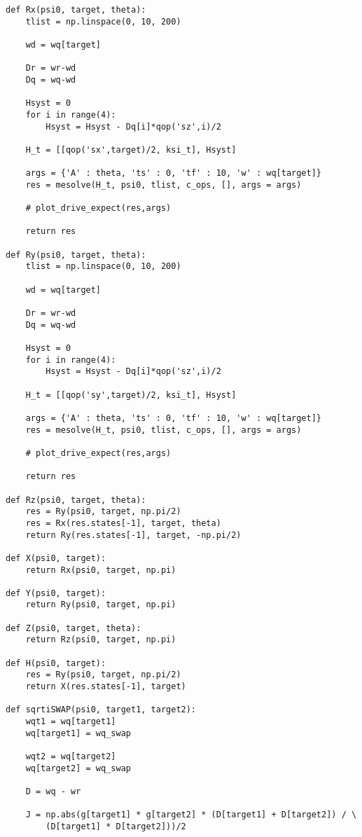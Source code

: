 \begin{verbatim}
def Rx(psi0, target, theta):
    tlist = np.linspace(0, 10, 200)

    wd = wq[target]

    Dr = wr-wd
    Dq = wq-wd

    Hsyst = 0
    for i in range(4):
        Hsyst = Hsyst - Dq[i]*qop('sz',i)/2

    H_t = [[qop('sx',target)/2, ksi_t], Hsyst]

    args = {'A' : theta, 'ts' : 0, 'tf' : 10, 'w' : wq[target]}
    res = mesolve(H_t, psi0, tlist, c_ops, [], args = args)

    # plot_drive_expect(res,args)

    return res

def Ry(psi0, target, theta):
    tlist = np.linspace(0, 10, 200)

    wd = wq[target]

    Dr = wr-wd
    Dq = wq-wd

    Hsyst = 0
    for i in range(4):
        Hsyst = Hsyst - Dq[i]*qop('sz',i)/2

    H_t = [[qop('sy',target)/2, ksi_t], Hsyst]

    args = {'A' : theta, 'ts' : 0, 'tf' : 10, 'w' : wq[target]}
    res = mesolve(H_t, psi0, tlist, c_ops, [], args = args)

    # plot_drive_expect(res,args)

    return res

def Rz(psi0, target, theta):
    res = Ry(psi0, target, np.pi/2)
    res = Rx(res.states[-1], target, theta)
    return Ry(res.states[-1], target, -np.pi/2)

def X(psi0, target):
    return Rx(psi0, target, np.pi)

def Y(psi0, target):
    return Ry(psi0, target, np.pi)

def Z(psi0, target, theta):
    return Rz(psi0, target, np.pi)

def H(psi0, target):
    res = Ry(psi0, target, np.pi/2)
    return X(res.states[-1], target)

def sqrtiSWAP(psi0, target1, target2):
    wqt1 = wq[target1]
    wq[target1] = wq_swap
    
    wqt2 = wq[target2]
    wq[target2] = wq_swap

    D = wq - wr

    J = np.abs(g[target1] * g[target2] * (D[target1] + D[target2]) / \
        (D[target1] * D[target2]))/2


\end{verbatim}
